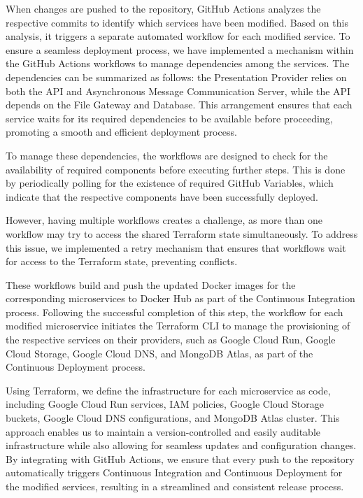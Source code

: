 \documentclass[a4paper,fleqn]{cas-dc}
\begin{document}
When changes are pushed to the repository, GitHub Actions analyzes the respective commits to identify which services have been modified. Based on this analysis, it triggers a separate automated workflow for each modified service. To ensure a seamless deployment process, we have implemented a mechanism within the GitHub Actions workflows to manage dependencies among the services. The dependencies can be summarized as follows: the Presentation Provider relies on both the API and Asynchronous Message Communication Server, while the API depends on the File Gateway and Database. This arrangement ensures that each service waits for its required dependencies to be available before proceeding, promoting a smooth and efficient deployment process.

To manage these dependencies, the workflows are designed to check for the availability of required components before executing further steps. This is done by periodically polling for the existence of required GitHub Variables, which indicate that the respective components have been successfully deployed.

However, having multiple workflows creates a challenge, as more than one workflow may try to access the shared Terraform state simultaneously. To address this issue, we implemented a retry mechanism that ensures that workflows wait for access to the Terraform state, preventing conflicts.

These workflows build and push the updated Docker images for the corresponding microservices to Docker Hub as part of the Continuous Integration process. Following the successful completion of this step, the workflow for each modified microservice initiates the Terraform CLI to manage the provisioning of the respective services on their providers, such as Google Cloud Run, Google Cloud Storage, Google Cloud DNS, and MongoDB Atlas, as part of the Continuous Deployment process.

Using Terraform, we define the infrastructure for each microservice as code, including Google Cloud Run services, IAM policies, Google Cloud Storage buckets, Google Cloud DNS configurations, and MongoDB Atlas cluster. This approach enables us to maintain a version-controlled and easily auditable infrastructure while also allowing for seamless updates and configuration changes. By integrating with GitHub Actions, we ensure that every push to the repository automatically triggers Continuous Integration and Continuous Deployment for the modified services, resulting in a streamlined and consistent release process.
\end{document}

